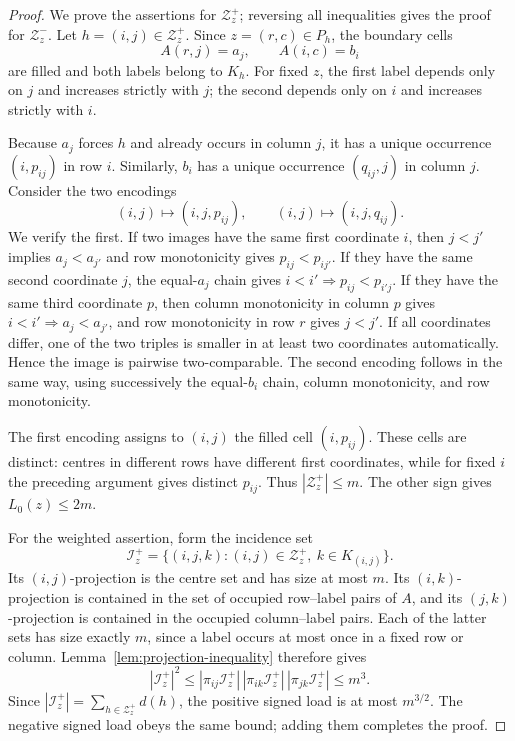 \documentclass[11pt]{article}
\numberwithin{equation}{section}
\theoremstyle{definition}
\theoremstyle{remark}
\begin{document}
\begin{proof}
We prove the assertions for $\mathcal Z_z^+$; reversing all inequalities gives
the proof for $\mathcal Z_z^-$.  Let $h=(i,j)\in\mathcal Z_z^+$.  Since
$z=(r,c)\in P_h$, the boundary cells
\[
 A(r,j)=a_j,\qquad A(i,c)=b_i
\]
are filled and both labels belong to $K_h$.  For fixed $z$, the first label
depends only on $j$ and increases strictly with $j$; the second depends only
on $i$ and increases strictly with $i$.

Because $a_j$ forces $h$ and already occurs in column $j$, it has a unique
occurrence $(i,p_{ij})$ in row $i$.  Similarly, $b_i$ has a unique occurrence
$(q_{ij},j)$ in column $j$.  Consider the two encodings
\begin{equation}\label{eq:pressure-encodings}
 (i,j)\longmapsto(i,j,p_{ij}),
 \qquad
 (i,j)\longmapsto(i,j,q_{ij}).
\end{equation}
We verify the first.  If two images have the same first coordinate $i$, then
$j<j'$ implies $a_j<a_{j'}$ and row monotonicity gives
$p_{ij}<p_{ij'}$.  If they have the same second coordinate $j$, the
equal-$a_j$ chain gives $i<i'\Rightarrow p_{ij}<p_{i'j}$.  If they have the
same third coordinate $p$, then column monotonicity in column $p$ gives
$i<i'\Rightarrow a_j<a_{j'}$, and row monotonicity in row $r$ gives $j<j'$.
If all coordinates differ, one of the two triples is smaller in at least two
coordinates automatically.  Hence the image is pairwise two-comparable.  The
second encoding follows in the same way, using successively the equal-$b_i$
chain, column monotonicity, and row monotonicity.

The first encoding assigns to $(i,j)$ the filled cell $(i,p_{ij})$.  These
cells are distinct: centres in different rows have different first
coordinates, while for fixed $i$ the preceding argument gives distinct
$p_{ij}$.  Thus $|\mathcal Z_z^+|\le m$.  The other sign gives
$L_0(z)\le2m$.

For the weighted assertion, form the incidence set
\[
 \mathcal I_z^+=\{(i,j,k):(i,j)\in\mathcal Z_z^+,\ k\in K_{(i,j)}\}.
\]
Its $(i,j)$-projection is the centre set and has size at most $m$.  Its
$(i,k)$-projection is contained in the set of occupied row--label pairs of
$A$, and its $(j,k)$-projection is contained in the occupied column--label
pairs.  Each of the latter sets has size exactly $m$, since a label occurs at
most once in a fixed row or column.  Lemma~\ref{lem:projection-inequality}
therefore gives
\[
 |\mathcal I_z^+|^2
 \le |\pi_{ij}\mathcal I_z^+|\,
      |\pi_{ik}\mathcal I_z^+|\,
      |\pi_{jk}\mathcal I_z^+|
 \le m^3.
\]
Since $|\mathcal I_z^+|=\sum_{h\in\mathcal Z_z^+}d(h)$, the positive signed
load is at most $m^{3/2}$.  The negative signed load obeys the same bound;
adding them completes the proof.
\end{proof}
\end{document}
